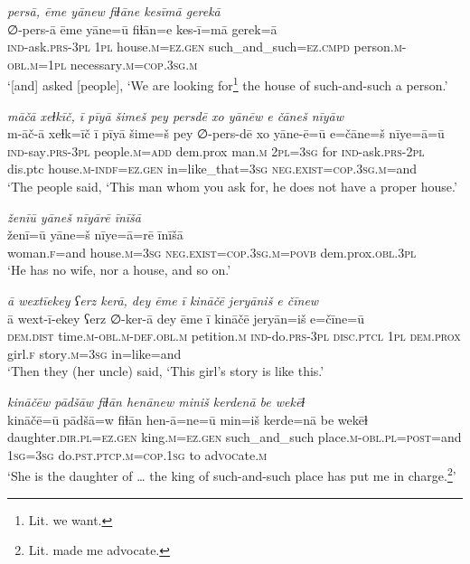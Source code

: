 \ea \label{ZP.84}
\textit{persā, ēme yānew fiɫāne kesīmā gerekā} \\ 
\gll ∅-pers-ā ēme yāne=ū fiɫān=e kes-ī=mā gerek=ā \\ 
 \textsc{ind-}ask\textsc{.prs}\textsc{-3pl} \textsc{1pl} house\textsc{.m}\textsc{\textsc{=ez.gen}} such\_and\_such\textsc{=ez}\textsc{.cmpd} person\textsc{.m}\textsc{-obl}\textsc{.m}\textsc{=1pl} necessary\textsc{.m}\textsc{=cop}\textsc{.3sg}\textsc{.m} \\ 
\glt `[and] asked [people], ‘We are looking for\footnote{Lit. we want.} the house of such-and-such a person.'
\z 
 
\ea \label{ZP.86}
\textit{māčā xeɫkīč, ī pīyā šimeš pey persdē xo yānēw e čāneš nīyāw} \\ 
\gll m-āč-ā xeɫk=īč ī pīyā šime=š pey ∅-pers-dē xo yāne-ē=ū e=čāne=š nīye=ā=ū \\ 
 \textsc{ind-}say\textsc{.prs}\textsc{-3pl} people\textsc{.m}\textsc{=add} dem.prox man\textsc{.m} \textsc{2pl}\textsc{=3sg} for \textsc{ind-}ask\textsc{.prs}-\textsc{2pl} dis.ptc house\textsc{.m}\textsc{-indf}\textsc{\textsc{=ez.gen}} in=like\_that\textsc{=3sg} \textsc{\textsc{neg.}exist}\textsc{=cop}\textsc{.3sg}\textsc{.m}=and \\ 
\glt `The people said, ‘This man whom you ask for, he does not have a proper house.'
\z 
 
\ea \label{ZP.87}
\textit{ženīū yāneš nīyārē īnīšā} \\ 
\gll ženī=ū yāne=š nīye=ā=rē īnīšā \\ 
 woman\textsc{.f}=and house\textsc{.m}\textsc{=3sg} \textsc{\textsc{neg.}exist}\textsc{=cop}\textsc{.3sg}\textsc{.m}\textsc{=\textsc{povb}} dem.prox\textsc{.obl}\textsc{.3pl} \\ 
\glt `He has no wife, nor a house, and so on.'
\z 
 
\ea \label{ZP.88}
\textit{ā wextīekey ʕerz kerā, dey ēme ī kināčē jeryāniš e čīnew} \\ 
\gll ā wext-ī-ekey ʕerz ∅-ker-ā dey ēme ī kināčē jeryān=iš e=čīne=ū \\ 
 \textsc{dem.dist} time\textsc{.m}\textsc{-obl}\textsc{.m}\textsc{-def}\textsc{.obl}\textsc{.m} petition\textsc{.m} \textsc{ind-}do\textsc{.prs}\textsc{-3pl} \textsc{disc.ptcl} \textsc{1pl} \textsc{dem.prox} girl\textsc{.f} story\textsc{.m}\textsc{=3sg} in=like=and \\ 
\glt `Then they (her uncle) said, ‘This girl’s story is like this.'
\z 
 
\ea \label{ZP.89}
\textit{kināčēw pādšāw fiɫān henānew miniš kerdenā be wekēɫ} \\ 
\gll kināčē=ū pādšā=w fiɫān hen-ā=ne=ū min=iš kerde=nā be wekēɫ \\ 
 daughter\textsc{.dir}\textsc{.pl}\textsc{\textsc{=ez.gen}} king\textsc{.m}\textsc{\textsc{=ez.gen}} such\_and\_such place\textsc{.m}\textsc{-obl}\textsc{.pl}\textsc{=\textsc{post}}=and \textsc{1sg}\textsc{=3sg} do\textsc{.pst}\textsc{.ptcp}\textsc{.m}\textsc{=cop}\textsc{.\textsc{1sg}} to ad\textsc{voc}ate\textsc{.m} \\ 
\glt `She is the daughter of … the king of such-and-such place has put me in charge.\footnote{Lit. made me advocate.}'
\z 
 
